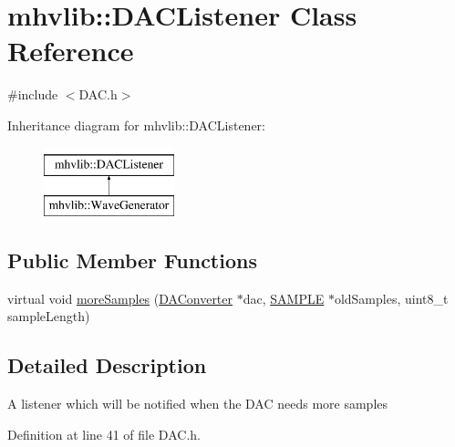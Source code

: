 \hypertarget{classmhvlib_1_1_d_a_c_listener}{\section{mhvlib\-:\-:D\-A\-C\-Listener Class Reference}
\label{classmhvlib_1_1_d_a_c_listener}
}


{\ttfamily \#include $<$D\-A\-C.\-h$>$}

Inheritance diagram for mhvlib\-:\-:D\-A\-C\-Listener\-:\begin{figure}[H]
\begin{center}
\leavevmode
\includegraphics[height=2.000000cm]{classmhvlib_1_1_d_a_c_listener}
\end{center}
\end{figure}
\subsection*{Public Member Functions}
\begin{DoxyCompactItemize}
\item 
virtual void \hyperlink{classmhvlib_1_1_d_a_c_listener_a7e30fdd9e7a8087aa6339fa31dfe2cb4}{more\-Samples} (\hyperlink{classmhvlib_1_1_d_a_converter}{D\-A\-Converter} $\ast$dac, \hyperlink{_d_a_c_8h_a5a6d1dc37ffa32957a63868cd1da39b3}{S\-A\-M\-P\-L\-E} $\ast$old\-Samples, uint8\-\_\-t sample\-Length)
\end{DoxyCompactItemize}


\subsection{Detailed Description}
A listener which will be notified when the D\-A\-C needs more samples 

Definition at line 41 of file D\-A\-C.\-h.



